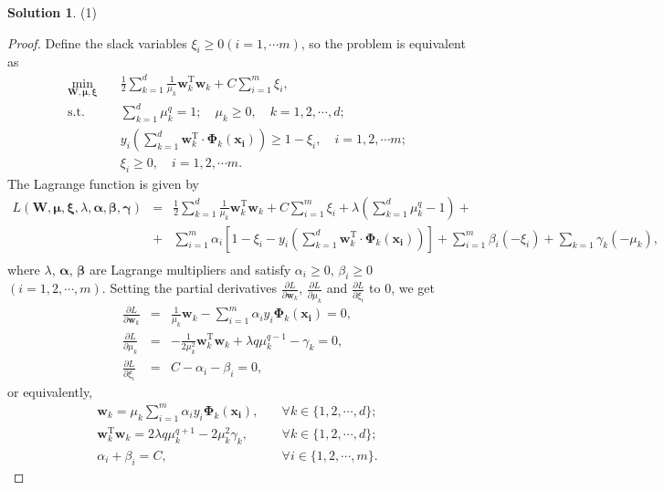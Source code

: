 \documentclass[a4paper,UTF8]{article}
\numberwithin{equation}{section}
\theoremstyle{definition}
\newtheorem*{solution}{Solution}
\begin{document}
\begin{solution}
\item[(1)] 
\begin{proof}
Define the slack variables $\xi_i\geq 0(i=1,\cdots m)$, so the problem is equivalent as
\begin{equation}
\begin{split}
\min_{\bm{W}, \bm{\mu}, \bm{\xi}} &\quad\frac{1}{2}\sum_{k=1}^d\frac{1}{\mu_k}\bm{w}_k^\mathrm{T}\bm{w}_k+C\sum_{i=1}^m\xi_i,\\
\text{s.t.} &\quad \sum_{k=1}^d\mu_k^q=1; \quad \mu_k\geq0,\quad k=1,2,\cdots,d;\\
&\quad y_i\left(\sum_{k=1}^d\bm{w}_k^\mathrm{T}\cdot\bm{\Phi}_k(\bm{x_i})\right)\geq 1-\xi_i, \quad i=1,2,\cdots m;\\
&\quad \xi_i\geq 0, \quad i=1,2,\cdots m.
\end{split}\label{pr}
\end{equation}
The Lagrange function is given by
\begin{eqnarray}\label{lag}
L(\bm{W}, \bm{\mu}, \bm{\xi}, \lambda, \bm{\alpha}, \bm{\beta}, \bm{\gamma})&=&\frac{1}{2}\sum_{k=1}^d\frac{1}{\mu_k}\bm{w}_k^\mathrm{T}\bm{w}_k+C\sum_{i=1}^m\xi_i+\lambda(\sum_{k=1}^d\mu_k^q-1)+\nonumber\\
&+&\sum_{i=1}^m\alpha_i[1-\xi_i-y_i(\sum_{k=1}^d\bm{w}_k^\mathrm{T}\cdot\bm{\Phi}_k(\bm{x_i}))]+\sum_{i=1}^m\beta_i(-\xi_i)+\sum_{k=1}\gamma_k(-\mu_k),\nonumber\\
\end{eqnarray}
where $\lambda$, $\bm{\alpha}$, $\bm{\beta}$ are Lagrange multipliers and satisfy $\alpha_i\geq0$, $\beta_i\geq0$ $(i=1,2,\cdots,m)$. Setting the partial derivatives $\frac{\partial L}{\partial \bm{w}_k}$, $\frac{\partial L}{\partial\mu_k}$ and $\frac{\partial L}{\partial\xi_i}$ to 0, we get
\begin{eqnarray}
\frac{\partial L}{\partial\bm{w}_k}&=&\frac{1}{\mu_k}\bm{w}_k-\sum_{i=1}^m\alpha_i y_i\bm{\Phi}_k(\bm{x_i})=0,\\
\frac{\partial L}{\partial\mu_k}&=&-\frac{1}{2\mu_k^2}\bm{w}_k^\mathrm{T}\bm{w}_k+\lambda q\mu_k^{q-1}-\gamma_k=0,\\
\frac{\partial L}{\partial\xi_i}&=&C-\alpha_i-\beta_i=0,
\end{eqnarray}
or equivalently,
\begin{eqnarray}
\bm{w}_k=\mu_k\sum_{i=1}^m\alpha_i y_i\bm{\Phi}_k(\bm{x_i}), &\quad \forall k\in\{1,2,\cdots, d\};\label{wk}\\
\bm{w}_k^\mathrm{T}\bm{w}_k=2\lambda q\mu_k^{q+1}-2\mu_k^2\gamma_k, &\quad\forall k\in\{1,2,\cdots, d\};\label{wk2}\\
\alpha_i+\beta_i=C, &\quad\forall i \in\{1,2,\cdots, m\}.\label{cab}
\end{eqnarray}


\end{proof}
\end{solution}
\end{document}
